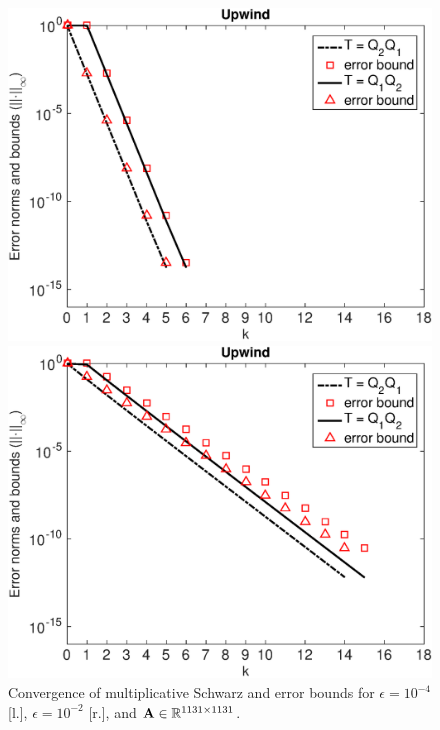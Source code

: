 %
\begin{figure}[tbhp]
\hspace*{-0.5em}
\begin{minipage}[t]{0.5\linewidth}
\includegraphics[width=0.95\linewidth]{figures/mSm_upwind2D_eps_1e-04_N_30_M_40}
\vspace*{-1em}
\end{minipage}
%
\begin{minipage}[t]{0.5\linewidth}
\includegraphics[width=0.95\linewidth]{figures/mSm_upwind2D_eps_1e-02_N_30_M_40}
\vspace*{-1em}
\end{minipage}
\vspace*{-1em}
\caption{Convergence of multiplicative Schwarz and error bounds for $\epsilon=10^{-4}$ [l.], $\epsilon=10^{-2}$ [r.], and $\mathbf{A} \in \mathbb{R}^{1131\times1131}$.}\label{fig:2D:err2}
\end{figure}

